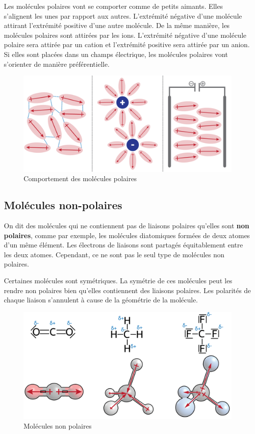 \documentclass[
  11pt,
  a4paper,
  openany]{book}
\begin{document}
Les molécules polaires vont se comporter comme de petits aimants. Elles s'alignent les unes par rapport aux autres. L'extrémité négative d'une molécule attirant l'extrémité positive d'une autre molécule. De la même manière, les molécules polaires sont attirées par les ions. L'extrémité négative d'une molécule polaire sera attirée par un cation et l'extrémité positive sera attirée par un anion. Si elles sont placées dans un champs électrique, les molécules polaires vont s'orienter de manière préférentielle.

\begin{figure}

{\centering \includegraphics[width=0.6\linewidth]{images/dipole-3} 

}

\caption{Comportement des molécules polaires}\label{fig:dipole-3}
\end{figure}

\subsection{Molécules non-polaires}\label{moluxe9cules-non-polaires}

On dit des molécules qui ne contiennent pas de liaisons polaires qu'elles sont \textbf{non polaires}, comme par exemple, les molécules diatomiques formées de deux atomes d'un même élément. Les électrons de liaisons sont partagés équitablement entre les deux atomes. Cependant, ce ne sont pas le seul type de molécules non polaires.

Certaines molécules sont symétriques. La symétrie de ces molécules peut les rendre non polaires bien qu'elles contiennent des liaisons polaires. Les polarités de chaque liaison s'annulent à cause de la géométrie de la molécule.

\begin{figure}

{\centering \includegraphics[width=0.5\linewidth]{images/dipole-4} 

}

\caption{Molécules non polaires}\label{fig:dipole-4}
\end{figure}
\end{document}
